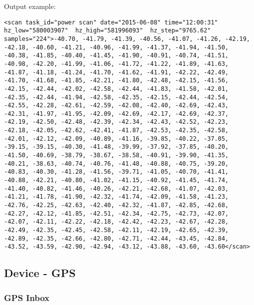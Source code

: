 Output example:
\begin{lstlisting}
<scan task_id="power scan" date="2015-06-08" time="12:00:31" hz_low="580003907"  hz_high="581996093"  hz_step="9765.62" samples="224">-40.70, -41.79, -41.39, -40.56, -41.07, -41.26, -42.19, -42.18, -40.60, -41.21, -40.96, -41.99, -41.37, -41.94, -41.50, -40.38, -41.85, -40.40, -41.45, -41.90, -40.91, -40.74, -41.51, -40.98, -42.20, -41.99, -41.06, -41.72, -41.22, -41.89, -41.63, -41.87, -41.18, -41.24, -41.70, -41.62, -41.91, -42.22, -42.49, -41.70, -41.68, -41.85, -42.21, -41.80, -42.48, -42.15, -41.56, -42.15, -42.44, -42.02, -42.58, -42.44, -41.83, -41.58, -42.01, -42.35, -42.44, -41.94, -42.58, -42.35, -42.15, -42.44, -42.54, -42.55, -42.28, -42.61, -42.59, -42.08, -42.40, -42.69, -42.43, -42.31, -41.97, -41.95, -42.09, -42.69, -42.17, -42.69, -42.37, -42.19, -42.50, -42.48, -42.39, -42.34, -42.43, -42.52, -42.23, -42.18, -42.05, -42.62, -42.41, -41.87, -42.53, -42.35, -42.58, -42.01, -42.12, -42.09, -40.89, -41.16, -39.85, -40.22, -37.05, -39.15, -39.15, -40.30, -41.48, -39.99, -37.92, -37.85, -40.20, -41.50, -40.69, -38.79, -38.67, -38.58, -40.91, -39.90, -41.35, -40.21, -38.63, -40.74, -40.76, -41.48, -40.88, -40.75, -39.20, -40.83, -40.30, -41.28, -41.56, -39.71, -41.05, -40.70, -41.41, -40.88, -42.21, -40.80, -41.02, -41.15, -40.92, -41.45, -41.74, -41.40, -40.82, -41.46, -40.26, -42.21, -42.68, -41.07, -42.03, -41.21, -41.78, -41.90, -42.32, -41.74, -42.09, -41.58, -41.23, -42.76, -42.25, -42.63, -42.40, -42.32, -41.87, -42.85, -42.68, -42.27, -42.12, -41.85, -42.51, -42.34, -42.75, -42.73, -42.07, -42.07, -42.11, -42.22, -42.18, -42.42, -42.23, -42.67, -42.28, -42.49, -42.35, -42.45, -42.58, -42.11, -42.19, -42.65, -42.39, -42.89, -42.35, -42.66, -42.80, -42.71, -42.44, -43.45, -42.84, -43.52, -43.59, -42.90, -42.94, -43.12, -43.88, -43.60, -43.60</scan>
\end{lstlisting}

\subsection{Device - GPS}
\subsubsection{GPS Inbox}

